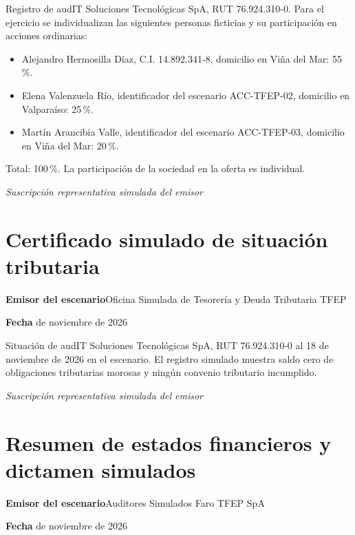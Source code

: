 Registro de audIT Soluciones Tecnológicas SpA, RUT 76.924.310-0. Para el ejercicio se individualizan las siguientes personas ficticias y su participación en acciones ordinarias:
\begin{itemize}
\item Alejandro Hermosilla Díaz, C.I. 14.892.341-8, domicilio en Viña del Mar: 55\,\%.
\item Elena Valenzuela Río, identificador del escenario ACC-TFEP-02, domicilio en Valparaíso: 25\,\%.
\item Martín Arancibia Valle, identificador del escenario ACC-TFEP-03, domicilio en Viña del Mar: 20\,\%.
\end{itemize}
Total: 100\,\%. La participación de la sociedad en la oferta es individual.

\medskip
\noindent\textit{Suscripción representativa simulada del emisor}\par
\label{adm:socios-fin}

\clearpage
\section*{Certificado simulado de situación tributaria}\label{adm:deuda}

\rotuloSimuladoSobreUno
\noindent\textbf{Emisor del escenario}\enspace Oficina Simulada de Tesorería y Deuda Tributaria TFEP\par
\noindent\textbf{Fecha} de noviembre de 2026\par
\medskip

Situación de audIT Soluciones Tecnológicas SpA, RUT 76.924.310-0 al 18 de noviembre de 2026 en el escenario. El registro simulado muestra saldo cero de obligaciones tributarias morosas y ningún convenio tributario incumplido.

\medskip
\noindent\textit{Suscripción representativa simulada del emisor}\par
\label{adm:deuda-fin}

\clearpage
\section*{Resumen de estados financieros y dictamen simulados}\label{adm:financieros}

\rotuloSimuladoSobreUno
\noindent\textbf{Emisor del escenario}\enspace Auditores Simulados Faro TFEP SpA\par
\noindent\textbf{Fecha} de noviembre de 2026\par
\medskip

